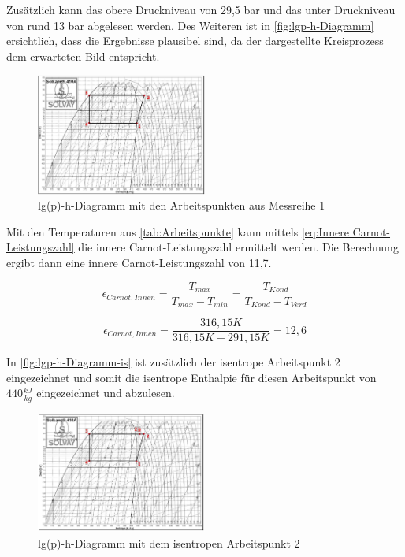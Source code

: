     Zusätzlich kann das obere Druckniveau von 29,5 bar und das unter Druckniveau von rund 13 bar abgelesen werden.
    Des Weiteren ist in \autoref{fig:lgp-h-Diagramm} ersichtlich, dass die Ergebnisse plausibel sind, da der dargestellte Kreisprozess dem erwarteten Bild entspricht.\\

    \begin{figure}[!h]
        \centering
        \includegraphics[width=0.5\textwidth]{Abbildungen/lgp-h-diagramm.jpg}
        \caption{lg(p)-h-Diagramm mit den Arbeitspunkten aus Messreihe 1}
        \label{fig:lgp-h-Diagramm}
    \end{figure}

Mit den Temperaturen aus \autoref{tab:Arbeitspunkte} kann mittels \autoref{eq:Innere Carnot-Leistungszahl} die innere Carnot-Leistungszahl
ermittelt werden. Die Berechnung ergibt dann eine innere Carnot-Leistungszahl von 11,7.

    \begin{equation}
        \epsilon_{Carnot, Innen}=\frac{T_{max}}{T_{max}-T_{min}}=\frac{T_{Kond}}{T_{Kond}-T_{Verd}}
        \label{eq:Innere Carnot-Leistungszahl}
    \end{equation}

$$\epsilon_{Carnot, Innen}=\frac{316,15 K}{316,15 K-291,15 K}=12,6$$

 In \autoref{fig:lgp-h-Diagramm-is} ist zusätzlich der isentrope Arbeitspunkt 2 eingezeichnet und somit die isentrope Enthalpie für diesen Arbeitspunkt von $440 \frac{kJ}{kg}$
 eingezeichnet und abzulesen.
    
 \begin{figure}[!h]
        \centering
        \includegraphics[width=0.5\textwidth]{Abbildungen/lgp-h-diagramm-is.jpg}
        \caption{lg(p)-h-Diagramm mit dem isentropen Arbeitspunkt 2}
        \label{fig:lgp-h-Diagramm-is}
    \end{figure}


